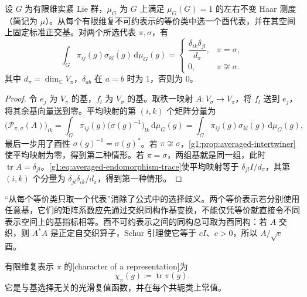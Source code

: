 \begin{theorem}\label{g1:thm:schur-orthogonality}
	设 \(G\) 为有限维实紧 Lie 群，\(\mu_G\) 为 \(G\) 上满足 \(\mu_G(G)=1\) 的左右不变 Haar 测度（简记为 \(\mu\)）。从每个有限维复不可约表示的等价类中选一个酉代表，并在其空间上固定标准正交基。对两个所选代表 \(\pi,\sigma\)，有
	\begin{equation}\label{g1:eq:schur-matrix-orthogonality}
		\int_G\pi_{ij}(g)\overline{\sigma_{kl}(g)}\,\mathrm{d}\mu_G(g)
		=\begin{cases}
			\dfrac{\delta_{ik}\delta_{jl}}{d_\pi},&\pi=\sigma,\\[4pt]
			0,&\pi\not\cong\sigma.
		\end{cases}
	\end{equation}
	其中 \(d_\pi=\dim_{\mathbb C}V_\pi\)，\(\delta_{ab}\) 在 \(a=b\) 时为 \(1\)，否则为 \(0\)。
\end{theorem}
\begin{proof}
	令 \(e_j\) 为 \(V_\pi\) 的基，\(f_l\) 为 \(V_\sigma\) 的基。取秩一映射 \(A:V_\sigma\to V_\pi\)，将 \(f_l\) 送到 \(e_j\)，将其余基向量送到零。平均映射的第 \((i,k)\) 个矩阵分量为
	\[
		\bigl(\mathcal P_{\pi,\sigma}(A)\bigr)_{ik}
		=\int_G\pi_{ij}(g)\bigl(\sigma(g)^{-1}\bigr)_{lk}\,\mathrm{d}\mu_G(g)
		=\int_G\pi_{ij}(g)\overline{\sigma_{kl}(g)}\,\mathrm{d}\mu_G(g),
	\]
	最后一步用了酉性 \(\sigma(g)^{-1}=\sigma(g)^*\)。若 \(\pi\not\cong\sigma\)，\cref{g1:prop:averaged-intertwiner}使平均映射为零，得到第二种情形。若 \(\pi=\sigma\)，两组基就是同一组，此时 \(\operatorname{tr}A=\delta_{jl}\)。\eqref{g1:eq:averaged-endomorphism-trace}使平均映射等于 \(\delta_{jl}I/d_\pi\)，其第 \((i,k)\) 个分量为 \(\delta_{jl}\delta_{ik}/d_\pi\)，得到第一种情形。
\end{proof}

“从每个等价类只取一个代表”消除了公式中的选择歧义。两个等价表示若分别使用任意基，它们的矩阵系数应先通过交织同构作基变换，不能仅凭等价就直接令不同表示空间上的基指标相等。酉不可约表示之间的同构总可取为酉同构：若 \(A\) 交织，则 \(A^*A\) 是正定自交织算子，Schur 引理使它等于 \(cI\)、\(c>0\)，所以 \(A/\sqrt c\) 酉。

\begin{definition}\label{g1:def:representation-character}
	有限维复表示 \(\pi\) 的[character of a representation]为
	\[
		\chi_\pi(g)\coloneqq\operatorname{tr}\pi(g).
	\]
	它是与基选择无关的光滑复值函数，并在每个共轭类上常值。
\end{definition}

